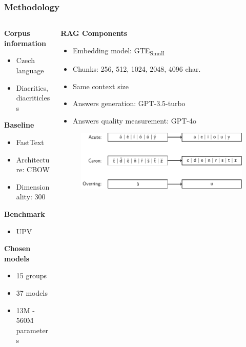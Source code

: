 \documentclass{beamer}
\begin{document}
\begin{frame}
  \frametitle{Methodology}
  \begin{columns}[onlytextwidth,T]
    \begin{column}{0.4\textwidth}
      \textcolor{cvut_navy}{\textbf{Corpus information}}
      \begin{itemize}
        \item Czech language
        \item Diacritics, diacriticless
      \end{itemize}
      \textcolor{cvut_navy}{\textbf{Baseline}}
      \begin{itemize}
        \item FastText
        \item Architecture: CBOW
        \item Dimensionality: 300
      \end{itemize}
      \textcolor{cvut_navy}{\textbf{Benchmark}}
      \begin{itemize}
        \item UPV
      \end{itemize}
      \textcolor{cvut_navy}{\textbf{Chosen models}}
      \begin{itemize}
        \item 15 groups
        \item 37 models
        \item 13M - 560M parameters
      \end{itemize}
    \end{column}
    \begin{column}{0.75\textwidth}
      \textcolor{cvut_navy}{\textbf{RAG Components}}
      \begin{itemize}
        \item Embedding model: GTE\textsubscript{Small}
        \item Chunks: 256, 512, 1024, 2048, 4096 char.
        \item Same context size
        \item Answers generation: GPT-3.5-turbo
        \item Answers quality measurement: GPT-4o
      \end{itemize}
      \begin{figure}
        \raggedright
        \includegraphics[scale=0.6]{src/fig/pdfs/tikz/diacritics_diacriticless.pdf}
      \end{figure}     
    \end{column}
  \end{columns}
    
  
\end{frame}
\end{document}
